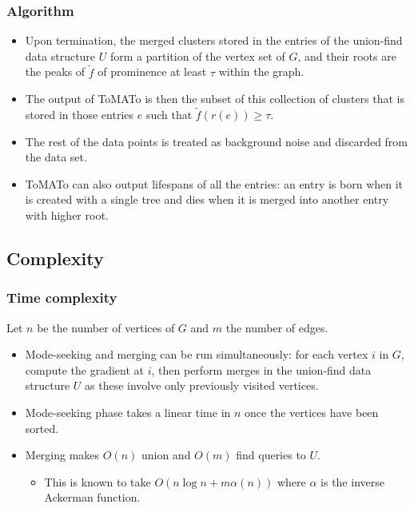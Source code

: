 \documentclass{beamer}
\theoremstyle{definition}
\begin{document}
\begin{frame}
\frametitle{Algorithm}
\begin{itemize}
\item<1-> Upon termination, the merged clusters stored in the entries of the union-find data
structure $U$ form a partition of the vertex set of $G$, and their roots are the peaks of $\tilde{f}$
of prominence at least $\tau$ within the graph. 

\item<2-> The output of ToMATo is then the subset of this collection of clusters that is stored in those entries $e$ such that $\tilde{f}(r(e))\geq \tau$. 

\item<3-> The rest of the data points is treated as
background noise and discarded from the data set.

\item<4-> ToMATo can also output lifespans of all the entries: an entry is born when it is created with a single tree and dies when it is merged into another entry with higher root.
\end{itemize}
\end{frame}

\subsection{Complexity}
\begin{frame}
\frametitle{Time complexity}
Let $n$ be the number of vertices of $G$ and $m$ the number of edges.
\begin{itemize}
\item<1-> Mode-seeking and merging can be run simultaneously: for each vertex $i$ in $G$, compute the gradient at $i$,
then perform merges in the union-find data structure $U$ as these involve only previously visited vertices.
\item<2-> Mode-seeking phase takes a linear time in $n$ once the vertices have been sorted.
\item<3-> Merging makes $O(n)$ union and $O(m)$ find queries to $U$. %
\begin{itemize}
\item <4->This is known to take $O(n \log n+m\alpha(n))$ where $\alpha$ is the inverse Ackerman function. %
\end{itemize}
\end{itemize}
\end{frame}
\end{document}
